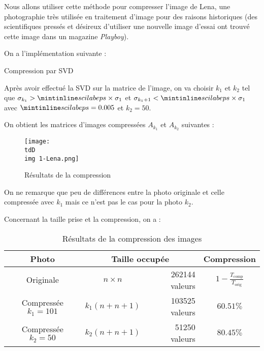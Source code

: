		Nous allons utiliser cette méthode pour compresser l'image de Lena, une photographie très utilisée en traitement d'image pour des raisons historiques (des scientifiques pressés et désireux d'utiliser une nouvelle image d'essai ont trouvé cette image dans un magazine \emph{Playboy}).

		On a l'implémentation suivante :
		\begin{listing}[H]
			\caption{Compression par SVD}
			\label{code-4-compression}
		\end{listing}

		Après avoir effectué la SVD sur la matrice de l'image, on va choisir $k_1$ et $k_2$ tel que $\sigma_{k_1} > \code{eps}\times\sigma_1$ et $\sigma_{k_1+1} < \code{eps}\times\sigma_1$ avec $\code{eps} = 0.005$ et $k_2 = 50$.

		On obtient les matrices d'images compressées $A_{k_1}$ et $A_{k_2}$ suivantes :
		\begin{figure}[H]
			\centering
			\texttt{[image: \\tdD\\img 1-Lena.png]}
			\caption{Résultats de la compression}
			\label{img-3-compressionLena}
		\end{figure}

		On ne remarque que peu de différences entre la photo originale et celle compressée avec $k_1$ mais ce n'est pas le cas pour la photo $k_2$.

		Concernant la taille prise et la compression, on a :
		\begin{table}[H]
			\centering
			\begin{tabular}{|c|c|r|c|}
				\hline
				Photo					& \multicolumn{2}{c|}{Taille occupée}	& Compression\footnotemark[1]								\\	\hline\hline
				Originale				& 	$n\times n$		& 262144 valeurs	& $1- \frac{T_\text{comp}}{T_\text{orig}} $	\\	\hline
				Compressée $k_1 = 101$	& 	$k_1(n+n+1)$	& 103525 valeurs	& $60.51 \%$								\\	\hline
				Compressée $k_2 = 50$	& 	$k_2(n+n+1)$	& 51250 valeurs		& $80.45 \%$				 				\\	\hline
			\end{tabular}
			\caption{Résultats de la compression des images}
			\label{tb-4-tailleImages}
		\end{table}

